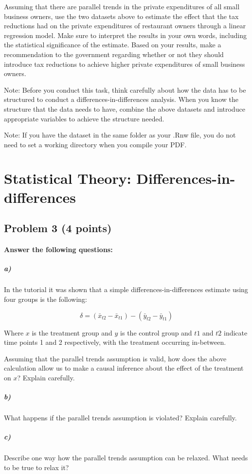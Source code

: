 \documentclass[12pt]{article}
\begin{document}
Assuming that there are parallel trends in the private expenditures of all small business owners, use the two datasets above to estimate the effect that the tax reductions had on the private expenditures of restaurant owners through a linear regression model. Make sure to interpret the results in your own words, including the statistical significance of the estimate. Based on your results, make a recommendation to the government regarding whether or not they should introduce tax reductions to achieve higher private expenditures of small business owners.

Note: Before you conduct this task, think carefully about how the data has to be structured to conduct a differences-in-differences analysis. When you know the structure that the data needs to have, combine the above datasets and introduce appropriate variables to achieve the structure needed.

Note: If you have the dataset in the same folder as your .Rnw file, you do not need to set a working directory when you compile your PDF.



\section*{Statistical Theory: Differences-in-differences}

\subsection*{Problem 3 (4 points)}

\paragraph{Answer the following questions:}

\subparagraph*{a)} In the tutorial it was shown that a simple differences-in-differences estimate using four groups is the following:

$$ \delta = (\bar{x} _{t2} - \bar{x} _{t1}) - (\bar{y} _{t2} - \bar{y} _{t1}) $$

Where $x$ is the treatment group and $y$ is the control group and $t1$ and $t2$ indicate time points 1 and 2 respectively, with the treatment occurring in-between.

Assuming that the parallel trends assumption is valid, how does the above calculation allow us to make a causal inference about the effect of the treatment on $x$? Explain carefully.

\subparagraph*{b)} What happens if the parallel trends assumption is violated? Explain carefully.

\subparagraph*{c)} Describe one way how the parallel trends assumption can be relaxed. What needs to be true to relax it?
\end{document}
